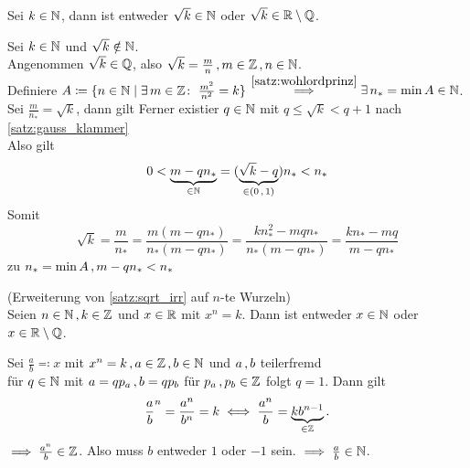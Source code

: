 \documentclass[../ana1.tex]{subfiles}
\begin{document}
\begin{satz}\label{satz:sqrt_irr}
	Sei \(k \in \mathbb{N} \), dann ist entweder \(\sqrt{k} \in \mathbb{N} \) oder \(\sqrt{k} \in \mathbb{R} \setminus \mathbb{Q} \).
\end{satz}
\begin{bew}
	Sei \(k \in \mathbb{N} \) und \(\sqrt{k} \notin \mathbb{N} \). \\
	Angenommen \(\sqrt{k} \in \mathbb{Q} \), also \(\sqrt{k} = \frac{m}{n} \operatorname{,} m \in \mathbb{Z} \operatorname{,} n \in \mathbb{N} \). \\
	Definiere \(A \coloneqq \{n \in \mathbb{N} \; \vert \; \exists \, m \in \mathbb{Z} \colon \; \frac{m^2}{n^2} = k\} \)
	\(\overset{\autoref{satz:wohlordprinz}}{\implies}\exists \, n_* = \min A \in \N \). \\
	Sei \(\frac{m}{n_*} = \sqrt{k} \), dann gilt
	Ferner existier \(q \in \mathbb{N} \) mit \(q \leq \sqrt{k} < q+1 \) nach \autoref{satz:gauss_klammer} \\
	Also gilt
	\[ 0 < \underbrace{m-qn_*}_{\in \mathbb{N}} = (\underbrace{\sqrt{k}-q}_{\in (0 \operatorname{,} 1)})n_* < n_* \]
	Somit 
	\[ \sqrt{k} = \frac{m}{n_*} = \frac{m(m - qn_*)}{n_*(m - qn_*)} = \frac{kn_*^2 - mqn_*}{n_*(m - qn_*)}=\frac{kn_* - mq}{m - qn_*} \]
	\Lightning{} zu \(n_* = \min A \operatorname{,} m-qn_* < n_* \)
\end{bew}

\iftoggle{short}{}{\newpage}%

\begin{bem}(Erweiterung von \autoref{satz:sqrt_irr} auf \(n \)-te Wurzeln) \leavevmode \\
	Seien \(n \in \mathbb{N} \operatorname{,} k \in \mathbb{Z} \) und \(x \in \mathbb{R} \) mit \(x^n = k \). Dann ist entweder \(x \in \mathbb{N} \) oder \(x \in \mathbb{R} \setminus \mathbb{Q} \).
\end{bem}
\begin{bew}
	Sei \(\frac{a}{b} \eqqcolon x \) mit \(x^n = k \operatorname{,} a \in \mathbb{Z} \operatorname{,} b \in \mathbb{N} \) und \(a \operatorname{,} b\) teilerfremd \\
	\dphp für \(q \in \mathbb{N} \) mit \(a = qp_a \operatorname{,} b = qp_b \) für \(p_a \operatorname{,} p_b \in \mathbb{Z} \) folgt \(q = 1 \).
	Dann gilt
	\[{\frac{a}{b}}^n = \frac{a^n}{b^n} = k \iff \frac{a^n}{b} = \underbrace{kb^{n - 1}}_{\in \mathbb{Z}}. \]
	\(\implies \frac{a^n}{b} \in \mathbb{Z} \). Also muss \(b \) entweder \(1 \) oder \(\minus 1 \) sein.
	\(\implies \frac{a}{b} \in \mathbb{N} \).
\end{bew}
\end{document}
